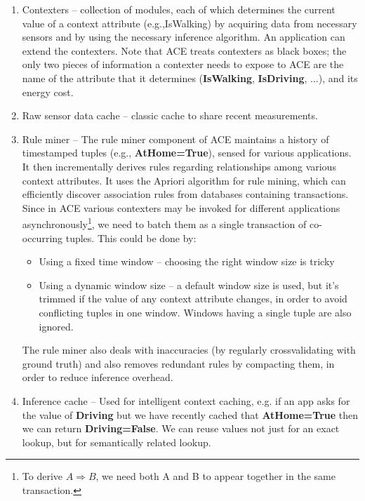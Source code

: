 \documentclass[12pt]{article}
\begin{document}
\begin{enumerate}[1.]
    \item Contexters -- collection of modules, each of which determines the
        current value of a context attribute (e.g.,IsWalking) by acquiring data
        from necessary sensors and by using the necessary inference algorithm.
        An application can extend the contexters. Note that ACE treats
        contexters as black boxes; the only two pieces of information
        a contexter needs to expose to ACE are the name of the attribute that
        it determines (\textbf{IsWalking}, \textbf{IsDriving}, $\dots$), and
        its energy cost.

    \item Raw sensor data cache -- classic cache to share recent measurements.

    \item Rule miner -- The rule miner component of ACE maintains a history of
        timestamped tuples (e.g., \textbf{AtHome=True}), sensed for various
        applications. It then incrementally derives rules regarding
        relationships among various context attributes. It uses the Apriori
        algorithm for rule mining, which can efficiently discover association
        rules from databases containing transactions. Since in ACE various
        contexters may be invoked for different applications
        asynchronously\footnote{To derive $A \Rightarrow B$, we need both A and
        B to appear together in the same transaction.}, we need to batch them
        as a single transaction of co-occurring tuples. This could be done
        by:
        \begin{itemize}
            \item Using a fixed time window -- choosing the right window size is tricky
            \item Using a dynamic window size -- a default window size is used,
                but it's trimmed if the value of any context attribute changes,
                in order to avoid conflicting tuples in one window. Windows
                having a single tuple are also ignored.
        \end{itemize}

        The rule miner also deals with inaccuracies (by regularly
        crossvalidating with ground truth) and also removes redundant rules by
        compacting them, in order to reduce inference overhead.

    \item Inference cache -- Used for intelligent context caching, e.g. if an
        app asks for the value of \textbf{Driving} but we have recently cached
        that \textbf{AtHome=True} then we can return \textbf{Driving=False}.
        We can reuse values not just for an exact lookup, but for semantically
        related lookup.


\end{enumerate}
\end{document}
